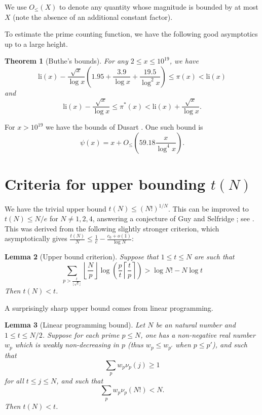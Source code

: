 \documentclass[12pt,a4paper,reqno]{amsart}
\numberwithin{equation}{section}
\theoremstyle{plain}
\newtheorem{theorem}{Theorem}[section]
\newtheorem{lemma}[theorem]{Lemma}
\theoremstyle{definition}
\begin{document}
We use $O_{\leq}(X)$ to denote any quantity whose magnitude is bounded by at most $X$ (note the absence of an additional constant factor).

To estimate the prime counting function, we have the following good asymptotics up to a large height.

  \begin{theorem}[Buthe's bounds]\cite{buthe}  For any $2 \leq x \leq 10^{19}$, we have
  $$ \mathrm{li}(x) - \frac{\sqrt{x}}{\log x}\left(1.95 + \frac{3.9}{\log x} + \frac{19.5}{\log^2 x}\right) \leq \pi(x) < \mathrm{li}(x)$$
  and
  $$ \mathrm{li}(x) - \frac{\sqrt{x}}{\log x} \leq \pi^*(x) < \mathrm{li}(x) + \frac{\sqrt{x}}{{\log x}}.$$
  \end{theorem}
  
  For $x > 10^{19}$ we have the bounds of Dusart \cite{dusart}.  One such bound is
  $$ \psi(x) = x + O_{\leq}(59.18 \frac{x}{\log^4 x}).$$

  
\section{Criteria for upper bounding \texorpdfstring{$t(N)$}{t(N)}}

We have the trivial upper bound $t(N) \leq (N!)^{1/N}$.  This can be improved to $t(N) \leq N/e$ for $N \neq 1,2,4$, answering a conjecture of Guy and Selfridge \cite{guy-selfridge}; see \cite{tao}.  This was derived from the following slightly stronger criterion, which asymptotically gives $\frac{t(N)}{N} \leq \frac{1}{e} - \frac{c_0+o(1)}{\log N}$:

\begin{lemma}[Upper bound criterion]\label{upper-crit}  \cite[Lemma 2.1]{tao} Suppose that $1 \leq t \leq N$ are such that
  \begin{equation}\label{contra}
     \sum_{p > \frac{t}{\lfloor\sqrt{t}\rfloor}} \left\lfloor \frac{N}{p} \right\rfloor \log \left( \frac{p}{t} \left\lceil \frac{t}{p} \right\rceil \right) > \log N! - N \log t
  \end{equation}
  Then $t(N) < t$.
  \end{lemma}

A surprisingly sharp upper bound comes from linear programming.

\begin{lemma}[Linear programming bound]\label{lp-upper}  Let $N$ be an natural number and $1 \leq t \leq N/2$.  Suppose for each prime $p \leq N$, one has a non-negative real number $w_p$ which is weakly non-decreasing in $p$ (thus $w_p \leq w_{p'}$ when $p \leq p'$), and such that
\begin{equation}\label{pj}
 \sum_p w_p \nu_p(j) \geq 1
\end{equation}
for all $t \leq j \leq N$, and such that
\begin{equation}\label{hyp}
\sum_p w_p \nu_p(N!) < N.
\end{equation}
Then $t(N) < t$.
\end{lemma}
\end{document}
